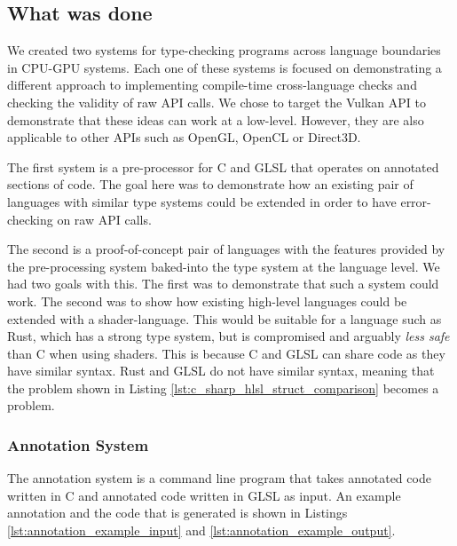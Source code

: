 \documentclass[a4paper,12pt,twoside,openright]{report}
\begin{document}
\subsection{What was done}

We created two systems for type-checking programs across language boundaries in
CPU-GPU systems. Each one of these systems is focused on demonstrating a
different approach to implementing compile-time cross-language checks and
checking the validity of raw API calls. We chose to target the Vulkan API to
demonstrate that these ideas can work at a low-level. However, they are also
applicable to other APIs such as OpenGL, OpenCL or Direct3D.

The first system is a pre-processor for C and GLSL that operates on annotated
sections of code. The goal here was to demonstrate how an existing pair of
languages with similar type systems could be extended in order to have
error-checking on raw API calls.

The second is a proof-of-concept pair of languages with the features provided
by the pre-processing system baked-into the type system at the language level.
We had two goals with this. The first was to demonstrate that such a system
could work. The second was to show how existing high-level languages could be
extended with a shader-language. This would be suitable for a language such as
Rust, which has a strong type system, but is compromised and arguably
\textit{less safe} than C when using shaders. This is because C and GLSL can
share code as they have similar syntax. Rust and GLSL do not have similar
syntax, meaning that the problem shown in Listing
\ref{lst:c_sharp_hlsl_struct_comparison} becomes a problem.

\subsubsection{Annotation System}

The annotation system is a command line program that takes annotated code
written in C and annotated code written in GLSL as input. An example annotation
and the code that is generated is shown in Listings
\ref{lst:annotation_example_input} and \ref{lst:annotation_example_output}.
\end{document}

